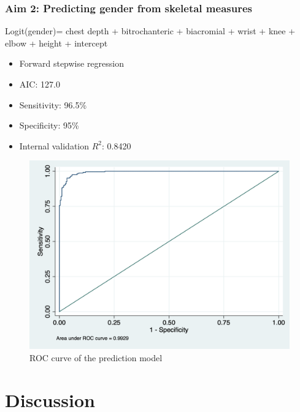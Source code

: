 \documentclass{beamer}
\begin{document}
\begin{frame}
\frametitle{Aim 2: Predicting gender from skeletal measures}

Logit(gender)= chest depth + bitrochanteric + biacromial + wrist + knee + elbow + height + intercept

\begin{itemize}
	\item Forward stepwise regression 
	\item AIC: 127.0
	\item Sensitivity: 96.5\%
	\item Specificity: 95\%
	\item Internal validation $R^2$: 0.8420
\end{itemize}

\end{frame}
\begin{figure}
	\includegraphics[scale=0.35]{Figure1.png}
	\caption{ROC curve of the prediction model}
	\label{fig:figure1}
\end{figure}

\section{Discussion}
\end{document}
